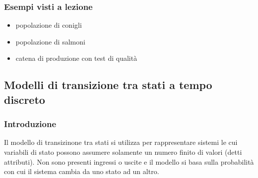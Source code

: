 \subsubsection*{Esempi visti a lezione}
\begin{itemize}
	\item popolazione di conigli
	\item popolazione di salmoni
	\item catena di produzione con test di qualità
\end{itemize}

\newpage

\subsection{Modelli di transizione tra stati a tempo discreto}
\subsubsection*{Introduzione}
Il modello di transizinone tra stati si utilizza per rappresentare sistemi le cui variabili di stato possono assumere solamente un
numero finito di valori (detti attributi). Non sono presenti ingressi o uscite e il modello si basa sulla probabilità con cui il
sistema cambia da uno stato ad un altro.


